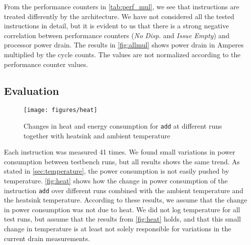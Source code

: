 From the performance counters in \autoref{tab:perf_mul}, we see that
instructions are treated differently by the architecture. We have not considered
all the tested instructions in detail, but it is evident to us that there is a
strong negative correlation between performance counters (\emph{No Disp.} and
\emph{Issue Empty}) and processor power drain. The results in
\autoref{fig:allmul} shows power drain in Amperes multiplied by the cycle
counts. The values are not normalized according to the performance counter
values.

\subsection{Evaluation}
\begin{figure}
    \centering
    \texttt{[image: figures/heat]}
    \caption{Changes in heat and energy consumption for \texttt{add} at
    different runs together with heatsink and ambient temperature}
    \label{fig:heat}
\end{figure}

Each instruction was measured 41 times. We found small variations in power
consumption between testbench runs, but all results shows the same trend. As
stated in \autoref{sec:temperature}, the power consumption is not easily pushed
by temperature. \autoref{fig:heat} shows how the change in power consumption of
the instruction \texttt{add} over different runs combined with the ambient
temperature and the heatsink temperature. According to these results, we assume
that the change in power consumption was not due to heat. We did not log
temperature for all test runs, but assume that the results from
\autoref{fig:heat} holds, and that this small change in temperature is at least
not solely responsible for variations in the current drain measurements.
